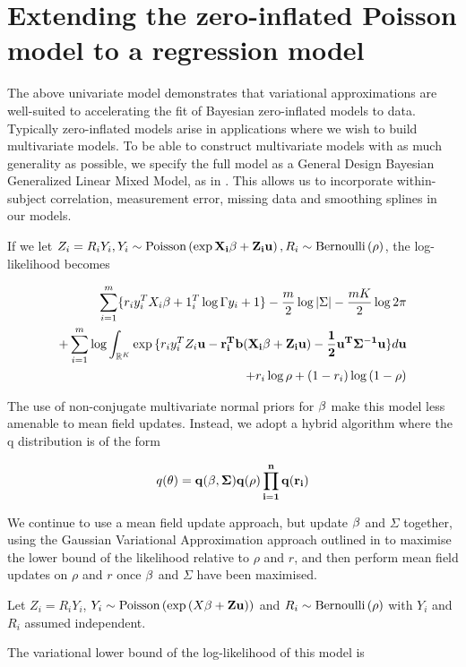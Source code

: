 \documentclass{amsart}
\begin{document}
\section{Extending the zero-inflated Poisson model to a regression model}
The above univariate model demonstrates that variational approximations are well-suited
to accelerating the fit of Bayesian zero-inflated models to data. Typically zero-inflated
models arise in applications where we wish to build multivariate models. To be able to
construct multivariate models with as much generality as possible, we specify the full
model as a General Design Bayesian Generalized Linear Mixed Model, as in \cite{zhao06}.
This allows us to incorporate within-subject correlation, measurement error, missing data
and smoothing splines in our models.

If we let $Z_i=R_i Y_i, Y_i \sim \text{Poisson} \left( \exp{\bf X_i\beta + \bf Z_i \bf u} \right), R_i \sim \text{Bernoulli} \left( \rho \right)$,
the log-likelihood becomes

\begin{align*}
\sum_{i=1}^m \{r_i y_i^TX_i \beta + 1_i^T \log{\Gamma{y_i + 1}}\} - \frac{m}{2} \log{|\Sigma|} - \frac{mK}{2} \log{2 \pi} \\
+ \sum_{i=1}^m \log{\int_{\mathbb{R}^K} \exp{\{r_i y_i^T Z_i \bf u- r_i^T b(X_i \bf \beta+ Z_i \bf u) - \frac{1}{2}\bf u^T \Sigma^{-1} \bf u\}} d \bf u} \\
+ r_i \log{\rho} + (1 - r_i) \log{(1 - \rho)}
\end{align*}

The use of non-conjugate multivariate normal priors for $\bf \beta$ make this model less
amenable to mean field updates. Instead, we adopt a hybrid algorithm where the q
distribution is of the form

$$
q(\bf \theta) = q(\bf \beta, \Sigma) q(\rho) \prod_{i=1}^n q(r_i)
$$

We continue to use a mean field update approach, but update $\bf \beta$ and $\Sigma$ together, using
the Gaussian Variational Approximation approach outlined in \cite{ormerod09} to maximise the
lower bound of the likelihood relative to $\rho$ and $r$, and then perform mean field updates on
$\rho$ and $r$ once $\bf \beta$ and $\Sigma$ have been maximised.


Let $Z_i = R_i Y_i$, $Y_i \sim \text{Poisson} \left( \exp{\left( X\bf \beta+ Z \bf u\right)} \right)$ and
$R_i \sim \text{Bernoulli} \left( \rho \right)$ with $Y_i$ and $R_i$ assumed independent.

The variational lower bound of the log-likelihood of this model is
\end{document}
